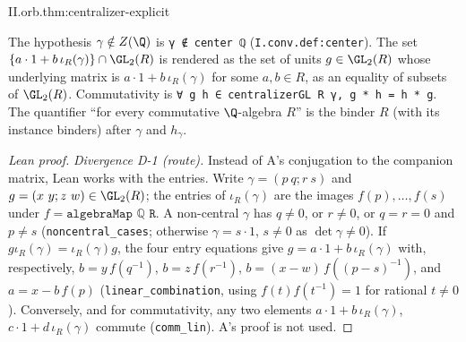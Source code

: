 \begin{theorem}
\end{theorem}
\begin{tfformal}{II.orb.thm:centralizer-explicit}
\begin{tffidelity}
The hypothesis $\gamma\notin Z(\Q)$ is \texttt{γ ∉ center ℚ} (\texttt{I.conv.def:center}). The set $\{a\cdot1+b\,\iota_R(\gamma)\}\cap\GL_2(R)$ is rendered as the set of units $g\in\GL_2(R)$ whose underlying matrix is $a\cdot1+b\,\iota_R(\gamma)$ for some $a,b\in R$, as an equality of subsets of $\GL_2(R)$. Commutativity is \texttt{∀ g h ∈ centralizerGL R γ, g * h = h * g}. The quantifier ``for every commutative $\Q$-algebra $R$'' is the binder $R$ (with its instance binders) after $\gamma$ and $h_\gamma$.
\end{tffidelity}
\end{tfformal}
\begin{proof}[Lean proof]
\emph{Divergence D-1 (route).} Instead of A's conjugation to the companion matrix, Lean works with the entries. Write $\gamma=(p\ q;r\ s)$ and $g=(x\ y;z\ w)\in\GL_2(R)$; the entries of $\iota_R(\gamma)$ are the images $f(p),\dots,f(s)$ under $f=\texttt{algebraMap ℚ R}$. A non-central $\gamma$ has $q\ne0$, or $r\ne0$, or $q=r=0$ and $p\ne s$ (\texttt{noncentral\_cases}; otherwise $\gamma=s\cdot1$, $s\ne0$ as $\det\gamma\ne0$). If $g\iota_R(\gamma)=\iota_R(\gamma)g$, the four entry equations give $g=a\cdot1+b\,\iota_R(\gamma)$ with, respectively, $b=y\,f(q^{-1})$, $b=z\,f(r^{-1})$, $b=(x-w)\,f((p-s)^{-1})$, and $a=x-b\,f(p)$ (\texttt{linear\_combination}, using $f(t)f(t^{-1})=1$ for rational $t\ne0$). Conversely, and for commutativity, any two elements $a\cdot1+b\,\iota_R(\gamma)$, $c\cdot1+d\,\iota_R(\gamma)$ commute (\texttt{comm\_lin}). A's proof is not used.
\end{proof}

